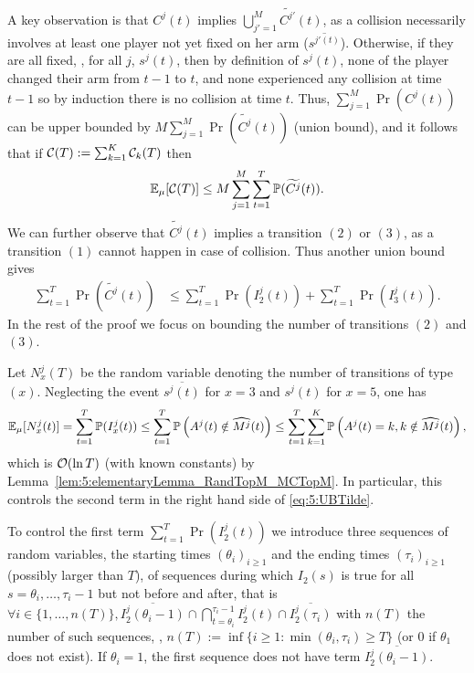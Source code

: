 A key observation is that $C^j(t)$ implies $\bigcup_{j'=1}^M \widetilde{C^{j'}}(t)$, as a collision necessarily involves at least one player not yet fixed on her arm ($\overline{s^{j'(t)}}$).
Otherwise, if they are all fixed, \ie, for all $j$, $s^j(t)$, then by definition of $s^j(t)$, none of the player changed their arm from $t-1$ to $t$, and none experienced any collision at time $t-1$ so by induction there is no collision at time $t$.
%
Thus, $\sum_{j=1}^M \Pr(C^j(t))$ can be upper bounded by $M \sum_{j=1}^M \Pr(\widetilde{C^j}(t))$ (union bound),
and it follows that if $\mathcal{C}(T) := \sum_{k=1}^K \mathcal{C}_k(T)$ then
\[\mathbb{E}_{\mu}[\mathcal{C}(T)] \leq M \sum_{j=1}^M \sum_{t=1}^T \mathbb{P}(\widetilde{C^j}(t)).\]
We can further  observe that $\widetilde{C^j}(t)$ implies a transition $(2)$ or $(3)$, as a transition $(1)$ cannot happen in case of collision. Thus another union bound gives
%
\begin{align}
  \sum_{t=1}^T \Pr(\widetilde{C^j}(t))
  &\leq \sum_{t=1}^T \Pr(I_2^j(t))   + \sum_{t=1}^T \Pr(I_3^j(t)).\label{eq:5:UBTilde}
\end{align}
In the rest of the proof we focus on bounding the number of transitions $(2)$ and $(3)$.


Let $N_x^j(T)$ be the random variable denoting the number of transitions of type $(x)$.
Neglecting the event $\overline{s^j(t)}$ for $x=3$ and $s^j(t)$ for $x=5$, one has
\begin{equation}
    \mathbb{E}_{\mu}[N_x^j(t)]
    = \sum_{t=1}^T \mathbb{P}(I_x^j(t))
    \leq \sum_{t=1}^T \mathbb{P} \left(A^j(t) \notin \widehat{M^j}(t)\right)
    \leq \sum_{t=1}^T \sum_{k=1}^K \mathbb{P} \left(A^j(t)=k, k \notin \widehat{M^j}(t)\right),
\end{equation}
which is $\mathop{}\mathopen{}\mathcal{O}\mathopen{}\left(\ln T\right)$ (with known constants) by Lemma~\ref{lem:5:elementaryLemma_RandTopM_MCTopM}. In particular, this controls the second term in the right hand side of \eqref{eq:5:UBTilde}.

To control the first term $\sum_{t=1}^T \Pr(I_2^j(t))$
we introduce three sequences of random variables,
the starting times $(\theta_i)_{i \geq 1}$
and the ending times $(\tau_i)_{i \geq 1}$
(possibly larger than $T$),
of sequences during which $I_2(s)$ is true for all $s=\theta_i,\dots,\tau_i-1$ but not before and after,
that is
$\forall i \in \{1,\dots,n(T)\},
\overline{I_2^j(\theta_i - 1)}
\cap \bigcap_{t=\theta_i}^{\tau_i-1} I_2^j(t)
\cap \overline{I_2^j(\tau_i)}
$
with $n(T)$ the number of such sequences,
\ie,
$n(T) := \inf \{i \geq 1 : \min(\theta_i, \tau_i) \geq T \}$
(or $0$ if $\theta_1$ does not exist).
%
If $\theta_i = 1$, the first sequence does not have term $\overline{I_2^j(\theta_i - 1)}$.

